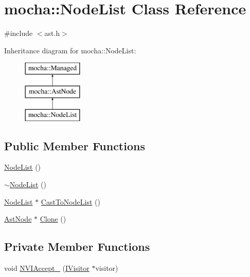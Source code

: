 \hypertarget{classmocha_1_1_node_list}{
\section{mocha::NodeList Class Reference}
\label{classmocha_1_1_node_list}
}


{\ttfamily \#include $<$ast.h$>$}

Inheritance diagram for mocha::NodeList:\begin{figure}[H]
\begin{center}
\leavevmode
\includegraphics[height=3.000000cm]{classmocha_1_1_node_list}
\end{center}
\end{figure}
\subsection*{Public Member Functions}
\begin{DoxyCompactItemize}
\item 
\hyperlink{classmocha_1_1_node_list_a6752c690ebff3781f28f8ecf40c6ef49}{NodeList} ()
\item 
\hyperlink{classmocha_1_1_node_list_a48d8cc7814defc30ddfabc92bafacc12}{$\sim$NodeList} ()
\item 
\hyperlink{classmocha_1_1_node_list}{NodeList} $\ast$ \hyperlink{classmocha_1_1_node_list_a7933d1250b8278abd9055b6c20eb7d4d}{CastToNodeList} ()
\item 
\hyperlink{classmocha_1_1_ast_node}{AstNode} $\ast$ \hyperlink{classmocha_1_1_node_list_a9e826e3da85ebff3ac151b627dd20d71}{Clone} ()
\end{DoxyCompactItemize}
\subsection*{Private Member Functions}
\begin{DoxyCompactItemize}
\item 
void \hyperlink{classmocha_1_1_node_list_a1c45823bfde4c1f6741342e226304531}{NVIAccept\_\-} (\hyperlink{classmocha_1_1_i_visitor}{IVisitor} $\ast$visitor)
\end{DoxyCompactItemize}


